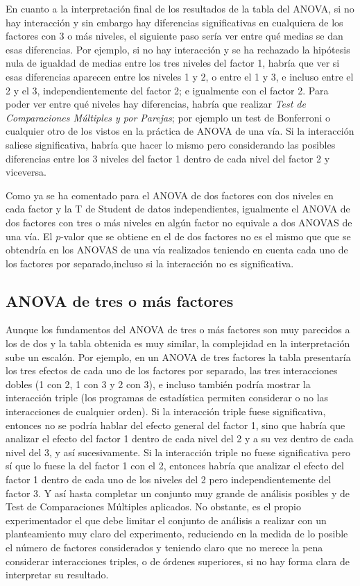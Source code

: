 \documentclass[
  a4paper,
]{scrreport}
\theoremstyle{plain}
\theoremstyle{definition}
\theoremstyle{definition}
\theoremstyle{remark}
\begin{document}
En cuanto a la interpretación final de los resultados de la tabla del
ANOVA, si no hay interacción y sin embargo hay diferencias
significativas en cualquiera de los factores con 3 o más niveles, el
siguiente paso sería ver entre qué medias se dan esas diferencias. Por
ejemplo, si no hay interacción y se ha rechazado la hipótesis nula de
igualdad de medias entre los tres niveles del factor 1, habría que ver
si esas diferencias aparecen entre los niveles 1 y 2, o entre el 1 y 3,
e incluso entre el 2 y el 3, independientemente del factor 2; e
igualmente con el factor 2. Para poder ver entre qué niveles hay
diferencias, habría que realizar \emph{Test de Comparaciones Múltiples y
por Parejas}; por ejemplo un test de Bonferroni o cualquier otro de los
vistos en la práctica de ANOVA de una vía. Si la interacción saliese
significativa, habría que hacer lo mismo pero considerando las posibles
diferencias entre los 3 niveles del factor 1 dentro de cada nivel del
factor 2 y viceversa.

Como ya se ha comentado para el ANOVA de dos factores con dos niveles en
cada factor y la T de Student de datos independientes, igualmente el
ANOVA de dos factores con tres o más niveles en algún factor no equivale
a dos ANOVAS de una vía. El \(p\)-valor que se obtiene en el de dos
factores no es el mismo que que se obtendría en los ANOVAS de una vía
realizados teniendo en cuenta cada uno de los factores por
separado,incluso si la interacción no es significativa.

\subsection{ANOVA de tres o más
factores}\label{anova-de-tres-o-muxe1s-factores}

Aunque los fundamentos del ANOVA de tres o más factores son muy
parecidos a los de dos y la tabla obtenida es muy similar, la
complejidad en la interpretación sube un escalón. Por ejemplo, en un
ANOVA de tres factores la tabla presentaría los tres efectos de cada uno
de los factores por separado, las tres interacciones dobles (1 con 2, 1
con 3 y 2 con 3), e incluso también podría mostrar la interacción triple
(los programas de estadística permiten considerar o no las interacciones
de cualquier orden). Si la interacción triple fuese significativa,
entonces no se podría hablar del efecto general del factor 1, sino que
habría que analizar el efecto del factor 1 dentro de cada nivel del 2 y
a su vez dentro de cada nivel del 3, y así sucesivamente. Si la
interacción triple no fuese significativa pero sí que lo fuese la del
factor 1 con el 2, entonces habría que analizar el efecto del factor 1
dentro de cada uno de los niveles del 2 pero independientemente del
factor 3. Y así hasta completar un conjunto muy grande de análisis
posibles y de Test de Comparaciones Múltiples aplicados. No obstante, es
el propio experimentador el que debe limitar el conjunto de análisis a
realizar con un planteamiento muy claro del experimento, reduciendo en
la medida de lo posible el número de factores considerados y teniendo
claro que no merece la pena considerar interacciones triples, o de
órdenes superiores, si no hay forma clara de interpretar su resultado.
\end{document}
